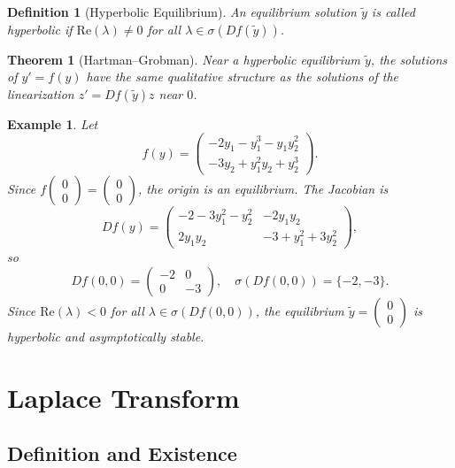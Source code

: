 \documentclass{article}
\newtheorem{theorem}{Theorem}
\newtheorem{definition}{Definition}
\newtheorem*{example}{Example}
\begin{document}
\begin{definition}[Hyperbolic Equilibrium]
    An equilibrium solution $\tilde{y}$ is called 
    \emph{hyperbolic} if $\mathrm{Re}(\lambda) \neq 0$ for all 
    $\lambda \in \sigma(Df(\tilde{y}))$.
\end{definition}

\begin{theorem}[Hartman--Grobman]
    Near a hyperbolic equilibrium $\tilde{y}$, the solutions of 
    $y' = f(y)$ have the same qualitative structure as the 
    solutions of the linearization $z' = Df(\tilde{y})z$ near $0$.
\end{theorem}

\begin{example}
    Let
    \[f(y) = \begin{pmatrix}-2y_1 - y_1^3 - y_1 y_2^2\\
    -3y_2 + y_1^2 y_2 + y_2^3\end{pmatrix}.\]
    Since $f\begin{pmatrix}0\\0\end{pmatrix} = 
    \begin{pmatrix}0\\0\end{pmatrix}$, the origin is an equilibrium. 
    The Jacobian is
    \[Df(y) = \begin{pmatrix}-2 - 3y_1^2 - y_2^2 & -2y_1 y_2\\
    2y_1 y_2 & -3 + y_1^2 + 3y_2^2\end{pmatrix},\]
    so
    \[Df(0,0) = \begin{pmatrix}-2 & 0\\ 0 & -3\end{pmatrix}, 
    \quad \sigma(Df(0,0)) = \{-2,-3\}.\]
    Since $\mathrm{Re}(\lambda) < 0$ for all 
    $\lambda \in \sigma(Df(0,0))$, the equilibrium 
    $\tilde{y} = \begin{pmatrix}0\\0\end{pmatrix}$ is hyperbolic 
    and asymptotically stable.
\end{example}

\section{Laplace Transform}

\subsection{Definition and Existence}
\end{document}
